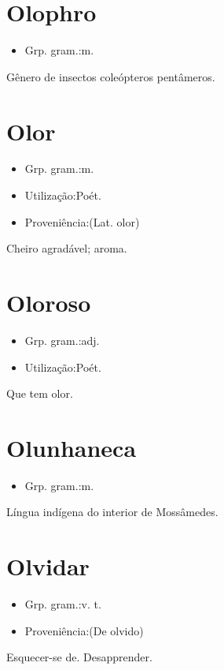 \section{Olophro}
\begin{itemize}
\item {Grp. gram.:m.}
\end{itemize}
Gênero de insectos coleópteros pentâmeros.
\section{Olor}
\begin{itemize}
\item {Grp. gram.:m.}
\end{itemize}
\begin{itemize}
\item {Utilização:Poét.}
\end{itemize}
\begin{itemize}
\item {Proveniência:(Lat. \textunderscore olor\textunderscore )}
\end{itemize}
Cheiro agradável; aroma.
\section{Oloroso}
\begin{itemize}
\item {Grp. gram.:adj.}
\end{itemize}
\begin{itemize}
\item {Utilização:Poét.}
\end{itemize}
Que tem olor.
\section{Olunhaneca}
\begin{itemize}
\item {Grp. gram.:m.}
\end{itemize}
Língua indígena do interior de Mossâmedes.
\section{Olvidar}
\begin{itemize}
\item {Grp. gram.:v. t.}
\end{itemize}
\begin{itemize}
\item {Proveniência:(De \textunderscore olvido\textunderscore )}
\end{itemize}
Esquecer-se de.
Desapprender.
